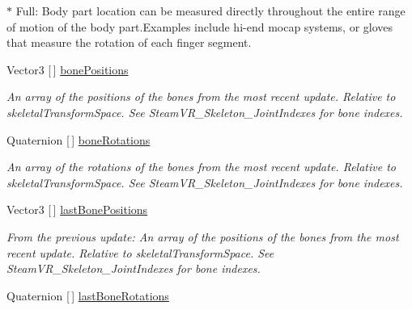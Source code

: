 \begin{DoxyCompactItemize}
\begin{DoxyCompactList}
$\ast$ Full\+: Body part location can be measured directly throughout the entire range of motion of the body part.\+Examples include hi-\/end mocap systems, or gloves that measure the rotation of each finger segment. \end{DoxyCompactList}\item 
Vector3 \mbox{[}$\,$\mbox{]} \mbox{\hyperlink{interface_valve_1_1_v_r_1_1_i_steam_v_r___action___skeleton___source_a6b9c8ff6ed0dc469ce0e08a97430eb86}{bone\+Positions}}
\begin{DoxyCompactList}\small\item\em An array of the positions of the bones from the most recent update. Relative to skeletal\+Transform\+Space. See Steam\+V\+R\+\_\+\+Skeleton\+\_\+\+Joint\+Indexes for bone indexes. \end{DoxyCompactList}\item 
Quaternion \mbox{[}$\,$\mbox{]} \mbox{\hyperlink{interface_valve_1_1_v_r_1_1_i_steam_v_r___action___skeleton___source_a8319bb5669b0f4d0b2fd73aa665777dd}{bone\+Rotations}}
\begin{DoxyCompactList}\small\item\em An array of the rotations of the bones from the most recent update. Relative to skeletal\+Transform\+Space. See Steam\+V\+R\+\_\+\+Skeleton\+\_\+\+Joint\+Indexes for bone indexes. \end{DoxyCompactList}\item 
Vector3 \mbox{[}$\,$\mbox{]} \mbox{\hyperlink{interface_valve_1_1_v_r_1_1_i_steam_v_r___action___skeleton___source_a7280f39174b242956481e88ca16bafe7}{last\+Bone\+Positions}}
\begin{DoxyCompactList}\small\item\em From the previous update\+: An array of the positions of the bones from the most recent update. Relative to skeletal\+Transform\+Space. See Steam\+V\+R\+\_\+\+Skeleton\+\_\+\+Joint\+Indexes for bone indexes. \end{DoxyCompactList}\item 
Quaternion \mbox{[}$\,$\mbox{]} \mbox{\hyperlink{interface_valve_1_1_v_r_1_1_i_steam_v_r___action___skeleton___source_afe35753e4dfcb69014edc98b29367460}{last\+Bone\+Rotations}}

\end{DoxyCompactItemize}
